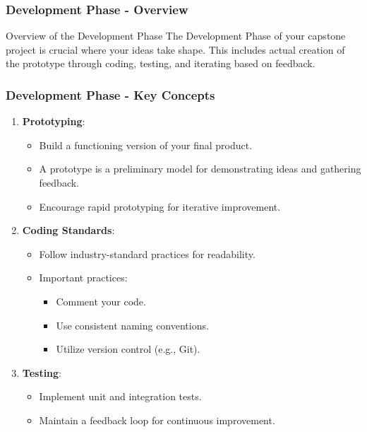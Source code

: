 \documentclass{beamer}
\begin{document}
\begin{frame}[fragile]
    \frametitle{Development Phase - Overview}
    \begin{block}{Overview of the Development Phase}
        The Development Phase of your capstone project is crucial where your ideas take shape. 
        This includes actual creation of the prototype through coding, testing, and iterating based on feedback.
    \end{block}
\end{frame}

\begin{frame}[fragile]
    \frametitle{Development Phase - Key Concepts}
    \begin{enumerate}
        \item \textbf{Prototyping}:
        \begin{itemize}
            \item Build a functioning version of your final product.
            \item A prototype is a preliminary model for demonstrating ideas and gathering feedback.
            \item Encourage rapid prototyping for iterative improvement.
        \end{itemize}
        
        \item \textbf{Coding Standards}:
        \begin{itemize}
            \item Follow industry-standard practices for readability.
            \item Important practices:
            \begin{itemize}
                \item Comment your code.
                \item Use consistent naming conventions.
                \item Utilize version control (e.g., Git).
            \end{itemize}
        \end{itemize}

        \item \textbf{Testing}:
        \begin{itemize}
            \item Implement unit and integration tests.
            \item Maintain a feedback loop for continuous improvement.
        \end{itemize}
    \end{enumerate}
\end{frame}
\end{document}
